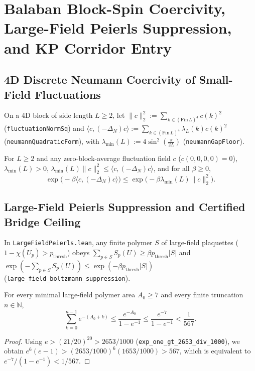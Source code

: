 \section{Balaban Block-Spin Coercivity, Large-Field Peierls Suppression, and KP Corridor Entry}
\label{sec:ch4}

\subsection{4D Discrete Neumann Coercivity of Small-Field Fluctuations}
On a 4D block of side length $L \ge 2$, let $\|c\|_2^2 := \sum_{k \in (\mathrm{Fin}\,L)^4} c(k)^2$ (\texttt{fluctuationNormSq}) and $\langle c, (-\Delta_N) c \rangle := \sum_{k \in (\mathrm{Fin}\,L)^4} \lambda_L(k) c(k)^2$ (\texttt{neumannQuadraticForm}), with $\lambda_{\min}(L) := 4\sin^2(\frac{\pi}{2L})$ (\texttt{neumannGapFloor}).

\begin{theorem}
\label{thm:balaban_coercivity}
For $L \ge 2$ and any zero-block-average fluctuation field $c$ ($c(0,0,0,0) = 0$), $\lambda_{\min}(L) > 0$, $\lambda_{\min}(L)\|c\|_2^2 \le \langle c, (-\Delta_N) c \rangle$, and for all $\beta \ge 0$,
\begin{equation}
\exp\!\big(-\beta \langle c, (-\Delta_N) c \rangle\big) \le \exp\!\big(-\beta \lambda_{\min}(L) \|c\|_2^2\big).
\end{equation}
\end{theorem}

\subsection{Large-Field Peierls Suppression and Certified Bridge Ceiling}
In \texttt{LargeFieldPeierls.lean}, any finite polymer $S$ of large-field plaquettes ($1 - \chi(U_p) > p_{\mathrm{thresh}}$) obeys $\sum_{p \in S} S_p(U) \ge \beta p_{\mathrm{thresh}} |S|$ and $\exp(-\sum_{p \in S} S_p(U)) \le \exp(-\beta p_{\mathrm{thresh}} |S|)$ (\texttt{large\_field\_boltzmann\_suppression}).

\begin{theorem}
\label{thm:peierls_beats_567}
For every minimal large-field polymer area $A_0 \ge 7$ and every finite truncation $n \in \mathbb{N}$,
\begin{equation}
\sum_{k=0}^{n-1} e^{-(A_0 + k)} \le \frac{e^{-A_0}}{1 - e^{-1}} \le \frac{e^{-7}}{1 - e^{-1}} < \frac{1}{567}.
\end{equation}
\end{theorem}

\begin{proof}
Using $e > (21/20)^{20} > 2653/1000$ (\texttt{exp\_one\_gt\_2653\_div\_1000}), we obtain $e^6(e - 1) > (2653/1000)^6 (1653/1000) > 567$, which is equivalent to $e^{-7}/(1 - e^{-1}) < 1/567$.
\end{proof}
